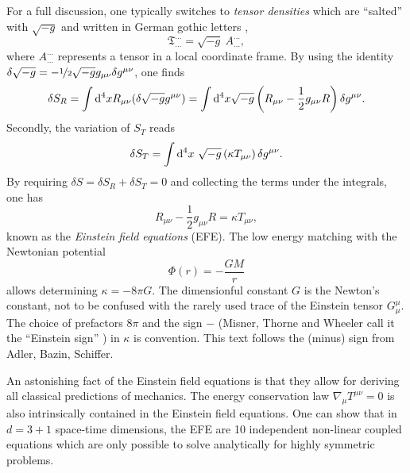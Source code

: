 \documentclass[12pt,a4paper]{report}
\numberwithin{equation}{chapter}
\begin{document}
For a full discussion, one typically switches to \emph{tensor densities} which are ``salted'' with $\sqrt{-g}$ and written in German gothic letters \cite{MTW},
\begin{equation}
\mathfrak{T}_{\dots}^{\dots} = \sqrt{-g}~A_{\dots}^{\dots},
\end{equation}
where $A_{\dots}^{\dots}$ represents a tensor in a local coordinate frame. By using the identity $\delta \sqrt{-g} = -\nicefrac 12 \sqrt{-g} g_{\mu\nu} \delta g^{\mu\nu}$, one finds
\begin{equation}
\delta S_R = \int \mathrm{d}^4 x R_{\mu\nu} (\delta \sqrt{-g} g^{\mu\nu})
= \int \mathrm{d}^4 x \sqrt{-g} \left( R_{\mu\nu} - \frac{1}{2} g_{\mu\nu} R \right) \delta g^{\mu\nu}.
\end{equation}
Secondly, the variation of $S_T$ reads
\begin{equation}
\delta S_T = \int \mathrm{d}^4 x~\sqrt{-g} \left( \kappa T_{\mu\nu} \right) \delta g^{\mu\nu}.
\end{equation}
By requiring $\delta S = \delta S_R + \delta S_T = 0$ and collecting the terms under the integrals, one has
\begin{equation}\label{eq:EFE}
R_{\mu\nu} - \frac{1}{2} g_{\mu\nu} R = \kappa T_{\mu\nu},
\end{equation}
known as the \emph{Einstein field equations} (EFE). The low energy matching with the Newtonian potential
\begin{equation}\label{eq:newton-potential}
\Phi(r) = - \frac{GM}r
\end{equation}
allows determining $\kappa = -8\pi G$. The dimensionful constant $G$ is the Newton's constant, not to be confused with the rarely used trace of the Einstein tensor $G^\mu_\mu$. The choice of prefactors $8\pi$ and the sign $-$ (Misner, Thorne and Wheeler call it the ``Einstein sign'' \cite{MTW}) in $\kappa$ is convention. This text follows the (minus) sign from Adler, Bazin, Schiffer.

An astonishing fact of the Einstein field equations is that they allow for deriving all classical predictions of mechanics. The energy conservation law $\nabla_\mu T^{\mu\nu} = 0$ is also intrinsically contained in the Einstein field equations. One can show that in $d=3+1$ space-time dimensions, the EFE are 10 independent non-linear coupled equations which are only possible to solve analytically for highly symmetric problems.

\end{document}
